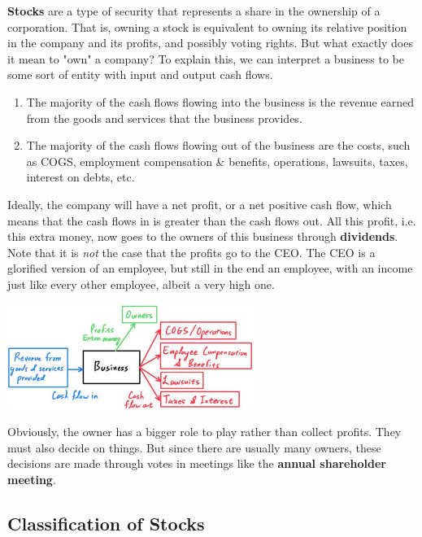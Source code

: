 \documentclass{article}
\begin{document}
  \textbf{Stocks} are a type of security that represents a share in the ownership of a corporation. That is, owning a stock is equivalent to owning its relative position in the company and its profits, and possibly voting rights. But what exactly does it mean to "own" a company? To explain this, we can interpret a business to be some sort of entity with input and output cash flows. 
  \begin{enumerate}
    \item The majority of the cash flows flowing into the business is the revenue earned from the goods and services that the business provides. 
    \item The majority of the cash flows flowing out of the business are the costs, such as COGS, employment compensation \& benefits, operations, lawsuits, taxes, interest on debts, etc.
  \end{enumerate}
  Ideally, the company will have a net profit, or a net positive cash flow, which means that the cash flows in is greater than the cash flows out. All this profit, i.e. this extra money, now goes to the owners of this business through \textbf{dividends}. Note that it is \textit{not} the case that the profits go to the CEO. The CEO is a glorified version of an employee, but still in the end an employee, with an income just like every other employee, albeit a very high one. 
  \begin{center}
    \includegraphics[width=0.6\textwidth]{img/Business_Cash_Flow.jpg}
  \end{center}

  Obviously, the owner has a bigger role to play rather than collect profits. They must also decide on things. But since there are usually many owners, these decisions are made through votes in meetings like the \textbf{annual shareholder meeting}. 

  \subsection{Classification of Stocks}
\end{document}
